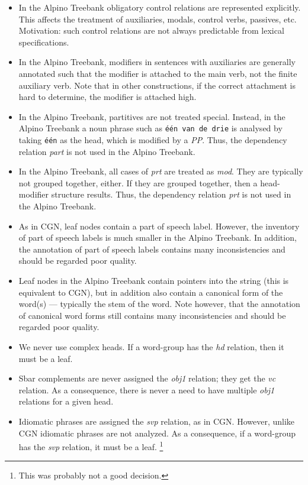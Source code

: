 \documentclass[12pt]{article}
\begin{document}
\begin{itemize}
  
\item In the Alpino Treebank obligatory control relations are
  represented explicitly. This affects the treatment of auxiliaries,
  modals, control verbs, passives, etc. Motivation: such control
  relations are not always predictable from lexical specifications.
  
\item In the Alpino Treebank, modifiers in sentences with auxiliaries
  are generally annotated such that the modifier is attached to the
  main verb, not the finite auxiliary verb. Note that in other
  constructions, if the correct attachment is hard to determine, the
  modifier is attached high.
  
\item In the Alpino Treebank, partitives are not treated special.
  Instead, in the Alpino Treebank a noun phrase such as {\tt \'e\'en
    van de drie} is analysed by taking {\tt \'e\'en} as the head,
  which is modified by a {\em PP}. Thus, the dependency relation {\em
    part} is not used in the Alpino Treebank.
  
\item In the Alpino Treebank, all cases of {\em prt} are treated as
  {\em mod}. They are typically not grouped together, either. If they
  are grouped together, then a head-modifier structure results. Thus, 
  the dependency relation {\em prt} is not used in the Alpino Treebank.

\item As in CGN, leaf nodes contain a part of speech label. However,
  the inventory of part of speech labels is much smaller in the Alpino
  Treebank. In addition, the annotation of part of speech labels
  contains many inconsistencies and should be regarded poor quality. 

\item Leaf nodes in the Alpino Treebank contain pointers into the
  string (this is equivalent to CGN), but in addition also contain a
  canonical form of the word(s) --- typically the stem of the
  word. Note however, that the annotation of canonical word forms
  still contains many inconsistencies and should be regarded poor
  quality. 

\item We never use complex heads. If a word-group has the {\em hd}
  relation, then it must be a leaf.

\item Sbar complements are never assigned the {\em obj1} relation; they
  get the {\em vc} relation. As a consequence, there is never a need
  to have multiple {\em obj1} relations for a given head.

\item Idiomatic phrases are assigned the {\em svp} relation, as in
  CGN. However, unlike CGN idiomatic phrases are not analyzed. As a
  consequence, if a word-group has the {\em svp} relation, it must be
  a leaf. \footnote{This was probably not a good decision.}

\end{itemize}
\end{document}
